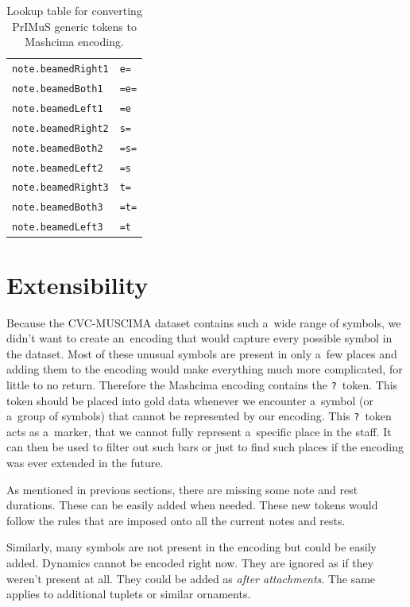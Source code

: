 \begin{table}[p]
\begin{tabular}{ll}
\midrule
\verb`note.beamedRight1` & \verb`e=` \\
\verb`note.beamedBoth1` & \verb`=e=` \\
\verb`note.beamedLeft1` & \verb`=e` \\
\midrule
\verb`note.beamedRight2` & \verb`s=` \\
\verb`note.beamedBoth2` & \verb`=s=` \\
\verb`note.beamedLeft2` & \verb`=s` \\
\midrule
\verb`note.beamedRight3` & \verb`t=` \\
\verb`note.beamedBoth3` & \verb`=t=` \\
\verb`note.beamedLeft3` & \verb`=t` \\
\bottomrule
\end{tabular}
\caption{Lookup table for converting PrIMuS generic tokens to Mashcima encoding.}
\label{tab4:TokenConversionLookup}
\end{table}


\section{Extensibility}
\label{sec:RepresentationExtensibility}

Because the CVC-MUSCIMA dataset contains such a~wide range of symbols, we didn't want to create an~encoding that would capture every possible symbol in the dataset. Most of these unusual symbols are present in only a~few places and adding them to the encoding would make everything much more complicated, for little to no return. Therefore the Mashcima encoding contains the \verb`?`~token. This token should be placed into gold data whenever we encounter a~symbol (or a~group of symbols) that cannot be represented by our encoding. This \verb`?`~token acts as a~marker, that we cannot fully represent a~specific place in the staff. It can then be used to filter out such bars or just to find such places if the encoding was ever extended in the future.

As mentioned in previous sections, there are missing some note and rest durations. These can be easily added when needed. These new tokens would follow the rules that are imposed onto all the current notes and rests.

Similarly, many symbols are not present in the encoding but could be easily added. Dynamics cannot be encoded right now. They are ignored as if they weren't present at all. They could be added as \emph{after attachments}. The same applies to additional tuplets or similar ornaments.

